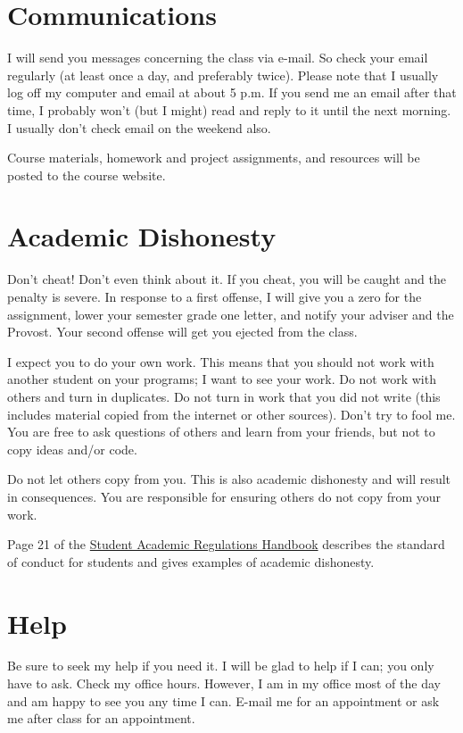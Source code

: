 \documentclass{article}
\begin{document}
\section{Communications}
I will send you messages concerning the class via e-mail.
So check your email regularly (at least once a day, and preferably twice).
Please note that I usually log off my computer and email at about 5 p.m.
If you send me an email after that time, I probably won't (but I might) read and reply to it until the next morning.
I usually don't check email on the weekend also.

Course materials, homework and project assignments, and resources will be posted to the course website.

\section{Academic Dishonesty}
Don't cheat! Don't even think about it.
If you cheat, you will be caught and the penalty is severe.
In response to a first offense, I will give you a zero for the assignment, lower your semester grade one letter, and notify your adviser and the Provost.
Your second offense will get you ejected from the class.

I expect you to do your own work.
This means that you should not work with another student on your programs; I want to see your work.
Do not work with others and turn in duplicates.
Do not turn in work that you did not write (this includes material copied from the internet or other sources).
Don't try to fool me.
You are free to ask questions of others and learn from your friends, but not to copy ideas and/or code.

Do not let others copy from you.
This is also academic dishonesty and will result in consequences.
You are responsible for ensuring others do not copy from your work.

Page 21 of the \href{http://registrar.mst.edu/academicregs/index.html}{Student Academic Regulations Handbook} describes the standard of conduct for students and gives examples of academic dishonesty.

\section{Help}
Be sure to seek my help if you need it.
I will be glad to help if I can; you only have to ask.
Check my office hours.
However, I am in my office most of the day and am happy to see you any time I can.
E-mail me for an appointment or ask me after class for an appointment.
\end{document}
